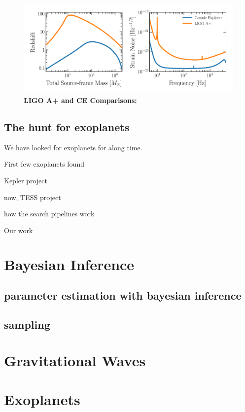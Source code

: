 \begin{figure}
\begin{center}
  \centerline{\includegraphics[width=1.\linewidth]{src/figures/ligo_vs_ce.png}}
  \caption{\textbf{LIGO A+ and CE Comparisons:}  }
  \label{fig:ligo_vs_ce}
\end{center}
\end{figure}




\subsection{The hunt for exoplanets}

We have looked for exoplanets for along time. 

First few exoplanets found 

Kepler project

now, TESS project

how the search pipelines work

Our work 





\section{Bayesian Inference}

\subsection{parameter estimation with bayesian inference}

\subsection{sampling}


\section{Gravitational Waves}




\section{Exoplanets}
